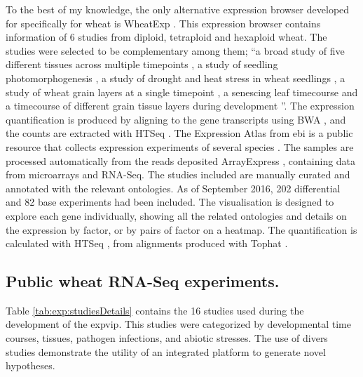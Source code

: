 To the best of my knowledge, the only alternative expression browser developed for specifically for wheat is WheatExp \citep{Pearce2015b}. 
This expression browser contains information of 6 studies from diploid, tetraploid and hexaploid wheat. 
The studies were selected to be complementary among them; ``a broad study of five different tissues across multiple timepoints \citep{Choulet2014}, a study of seedling photomorphogenesis \citep{Fox2014}, a study of drought and heat stress in wheat seedlings \citep{Liu2015}, a study of wheat grain layers at a single timepoint \citep{Pearce2015}, a senescing leaf timecourse \citep{Pearce2014} and a timecourse of different grain tissue layers during development \citep{Pfeifer2014}''.
The expression quantification is produced by aligning to the gene transcripts using BWA \citep{Li2010}, and the counts are extracted with HTSeq \citep{Anders2015}. 
The Expression Atlas from \acrshort{ebi} is a public resource that collects expression experiments of several species \citep{Petryszak2016}. 
The samples are processed automatically from the reads deposited ArrayExpress \citep{Kolesnikov2015}, containing data from microarrays and RNA-Seq.
The studies included are manually curated and annotated with the relevant ontologies. 
As of September 2016, 202 differential and 82 base experiments had been included. 
The visualisation is designed to explore each gene individually, showing all the related ontologies and details on the expression by factor, or by pairs of factor on a heatmap. 
The quantification is calculated with HTSeq \citep{Anders2015}, from alignments produced with Tophat \citep{Ling2013}.



\subsection{Public wheat RNA-Seq experiments.}

Table \ref{tab:exp:studiesDetails} contains the 16 studies used during the development of the \gls{expvip}. 
This studies were categorized by developmental time courses, tissues, pathogen infections, and abiotic stresses. 
The use of divers studies demonstrate the utility of an integrated platform to generate novel hypotheses. 



